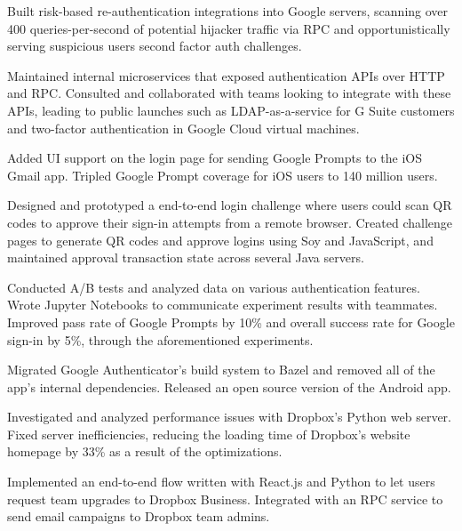 \documentclass[]{template}
\begin{document}
\hfill
{}
\begin{tightemize}
\item
  Built risk-based re-authentication integrations into Google servers, scanning
  over 400 queries-per-second of potential hijacker traffic via RPC and
  opportunistically serving suspicious users second factor auth challenges.
\item
  Maintained internal microservices that exposed authentication APIs over HTTP
  and RPC. Consulted and collaborated with teams looking to integrate with these
  APIs, leading to public launches such as LDAP-as-a-service for G Suite
  customers and two-factor authentication in Google Cloud virtual machines.
\item
  Added UI support on the login page for sending Google Prompts to the iOS Gmail
  app. Tripled Google Prompt coverage for iOS users to 140 million users.
\item
  Designed and prototyped a end-to-end login challenge where users could scan QR
  codes to approve their sign-in attempts from a remote browser. Created
  challenge pages to generate QR codes and approve logins using Soy and
  JavaScript, and maintained approval transaction state across several Java
  servers.
\item
  Conducted A/B tests and analyzed data on various authentication features.
  Wrote Jupyter Notebooks to communicate experiment results with teammates.
  Improved pass rate of Google Prompts by 10\% and overall success rate for
  Google sign-in by 5\%, through the aforementioned experiments.
\item
  Migrated Google Authenticator's build system to Bazel and removed all of the
  app's internal dependencies. Released an open source version of the Android
  app.
\item
\end{tightemize}

\sectionsep

\hfill
{}
\begin{tightemize}
\item
  Investigated and analyzed performance issues with Dropbox's Python web server.
  Fixed server inefficiencies, reducing the loading time of Dropbox's
  website homepage by 33\% as a result of the optimizations.
\item
  Implemented an end-to-end flow written with React.js and Python to let users
  request team upgrades to Dropbox Business. Integrated with an RPC service to
  send email campaigns to Dropbox team admins.
\item
\end{tightemize}
\end{document}

